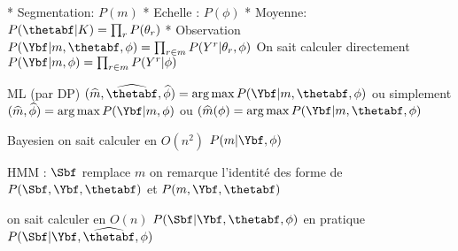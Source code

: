 * Segmentation: $P(m)$
* Echelle : $P(\phi)$
* Moyenne: $P(\thetabf | K) = \prod_r P(\theta_r)$
* Observation $P(\Ybf | m, \thetabf, \phi) = \prod_{r \in m} P(Y^r | \theta_r, \phi)$
On sait calculer directement $P(\Ybf | m, \phi) = \prod_{r \in m} P(Y^r | \phi)$

ML (par DP)
$(\widehat{m}, \widehat{\thetabf}, \widehat{\phi}) = \arg\max P(\Ybf | m, \thetabf, \phi)$
ou simplement
$(\widehat{m}, \widehat{\phi}) = \arg\max P(\Ybf | m, \phi)$
ou
$(\widehat{m}(\phi) = \arg\max P(\Ybf | m, \thetabf, \phi)$

Bayesien
on sait calculer en $O(n^2)$
$P(m | \Ybf, \phi)$

HMM : $\Sbf$ remplace $m$
on remarque l'identité des forme de $P(\Sbf, \Ybf, \thetabf)$ et $P(m, \Ybf, \thetabf)$

on sait calculer en $O(n)$
$P(\Sbf | \Ybf, \thetabf, \phi)$
en pratique
$P(\Sbf | \Ybf, \widehat{\thetabf}, \phi)$


